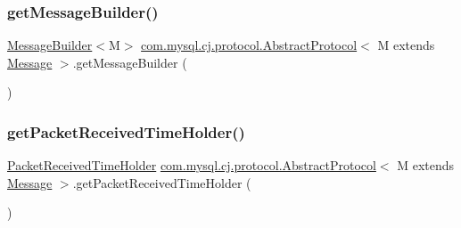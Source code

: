 \mbox{\label{classcom_1_1mysql_1_1cj_1_1protocol_1_1_abstract_protocol_aa92b21db9b10b5cba115e5b774d07c0b}} 
\subsubsection{\texorpdfstring{get\+Message\+Builder()}{getMessageBuilder()}}
{\footnotesize\ttfamily \mbox{\hyperlink{interfacecom_1_1mysql_1_1cj_1_1_message_builder}{Message\+Builder}}$<$M$>$ \mbox{\hyperlink{classcom_1_1mysql_1_1cj_1_1protocol_1_1_abstract_protocol}{com.\+mysql.\+cj.\+protocol.\+Abstract\+Protocol}}$<$ M extends \mbox{\hyperlink{interfacecom_1_1mysql_1_1cj_1_1protocol_1_1_message}{Message}} $>$.get\+Message\+Builder (\begin{DoxyParamCaption}{ }\end{DoxyParamCaption})}

\mbox{\label{classcom_1_1mysql_1_1cj_1_1protocol_1_1_abstract_protocol_a025a0ac5b57d98c04099b14d92a1ecc4}} 
\subsubsection{\texorpdfstring{get\+Packet\+Received\+Time\+Holder()}{getPacketReceivedTimeHolder()}}
{\footnotesize\ttfamily \mbox{\hyperlink{interfacecom_1_1mysql_1_1cj_1_1protocol_1_1_packet_received_time_holder}{Packet\+Received\+Time\+Holder}} \mbox{\hyperlink{classcom_1_1mysql_1_1cj_1_1protocol_1_1_abstract_protocol}{com.\+mysql.\+cj.\+protocol.\+Abstract\+Protocol}}$<$ M extends \mbox{\hyperlink{interfacecom_1_1mysql_1_1cj_1_1protocol_1_1_message}{Message}} $>$.get\+Packet\+Received\+Time\+Holder (\begin{DoxyParamCaption}{ }\end{DoxyParamCaption})}

